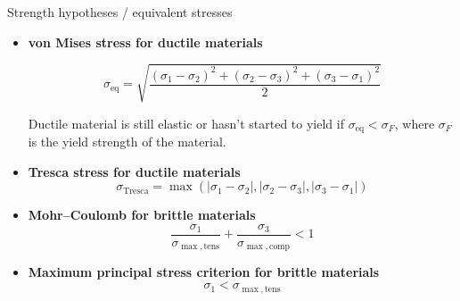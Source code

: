\documentclass[aspectratio=169]{beamer}
\begin{document}
\begin{frame}{Strength hypotheses / equivalent stresses}

  \begin{itemize}

    \item \textbf{von Mises stress for ductile materials}

          \vspace{-0.1cm}

          \[
            \sigma_{\mathrm{eq}}
            =
            \sqrt{
              \frac{
                (\sigma_1-\sigma_2)^2
                +
                (\sigma_2-\sigma_3)^2
                +
                (\sigma_3-\sigma_1)^2
              }{2}
            }
          \]

          Ductile material is still elastic or hasn't started to yield if $\sigma_{\mathrm{eq}} < \sigma_F$, where $\sigma_F$ is the yield strength of the material.

    \item \textbf{Tresca stress for ductile materials}
          \[
            \sigma_{\mathrm{Tresca}}
            =
            \max
            \left(
            |\sigma_1-\sigma_2|,
            |\sigma_2-\sigma_3|,
            |\sigma_3-\sigma_1|
            \right)
          \]

    \item \textbf{Mohr--Coulomb for brittle materials}
          \[
            \frac{\sigma_1}{\sigma_{\max,\mathrm{tens}}}
            +
            \frac{\sigma_3}{\sigma_{\max,\mathrm{comp}}}
            <1
          \]

    \item \textbf{Maximum principal stress criterion for brittle materials}
          \[
            \sigma_1 < \sigma_{\max,\mathrm{tens}}
          \]
  \end{itemize}
\end{frame}
\end{document}
